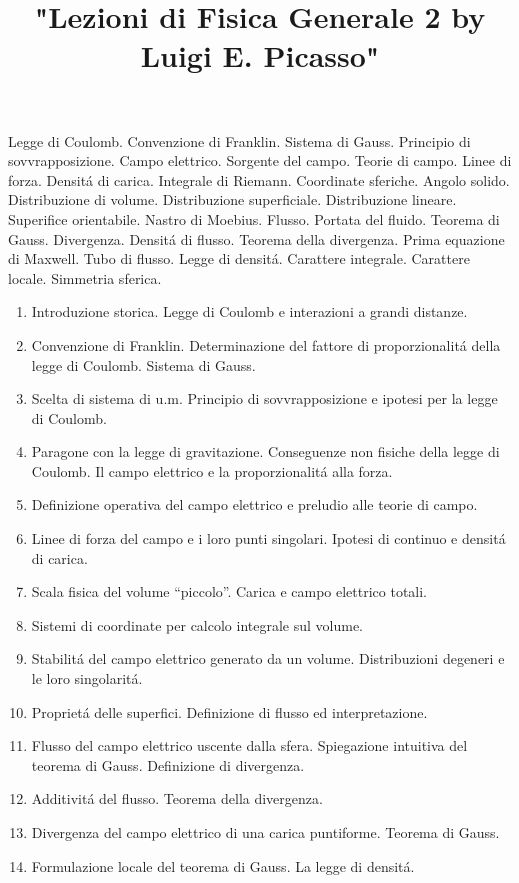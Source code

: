 

\usepackage[italian]{babel}

\title{"Lezioni di Fisica Generale 2 by Luigi E. Picasso"}


\maketitle

\begin{multicols}{3}
  Legge di Coulomb. Convenzione di Franklin. Sistema di Gauss. Principio di sovvrapposizione.
  Campo elettrico. Sorgente del campo. Teorie di campo. Linee di forza. Densit\'a di carica.
  Integrale di Riemann. Coordinate sferiche. Angolo solido. Distribuzione di volume.
  Distribuzione superficiale. Distribuzione lineare. Superifice orientabile. Nastro di Moebius. Flusso.
  Portata del fluido. Teorema di Gauss. Divergenza. Densit\'a di flusso. Teorema della divergenza.
  Prima equazione di Maxwell. Tubo di flusso. Legge di densit\'a. Carattere integrale. Carattere locale.
  Simmetria sferica.
\end{multicols}

\begin{multicols}{3}
  \begin{enumerate}
  \item Introduzione storica. Legge di Coulomb e interazioni a grandi distanze.
  \item Convenzione di Franklin. Determinazione del fattore di proporzionalit\'a della legge di Coulomb.
    Sistema di Gauss.
  \item Scelta di sistema di u.m. Principio di sovvrapposizione e ipotesi per la legge di Coulomb.
  \item Paragone con la legge di gravitazione. Conseguenze non fisiche della legge di Coulomb. Il campo elettrico e la proporzionalit\'a alla forza.
  \item Definizione operativa del campo elettrico e preludio alle teorie di campo.
  \item Linee di forza del campo e i loro punti singolari. Ipotesi di continuo e densit\'a di carica.
  \item Scala fisica del volume ``piccolo''. Carica e campo elettrico totali.
  \item Sistemi di coordinate per calcolo integrale sul volume.
  \item Stabilit\'a del campo elettrico generato da un volume. Distribuzioni degeneri e le loro singolarit\'a.
  \item Propriet\'a delle superfici. Definizione di flusso ed interpretazione.
  \item Flusso del campo elettrico uscente dalla sfera. Spiegazione intuitiva del teorema di Gauss. Definizione di divergenza.
  \item Additivit\'a del flusso. Teorema della divergenza.
  \item Divergenza del campo elettrico di una carica puntiforme. Teorema di Gauss.
  \item Formulazione locale del teorema di Gauss. La legge di densit\'a.
  \end{enumerate}
\end{multicols}

